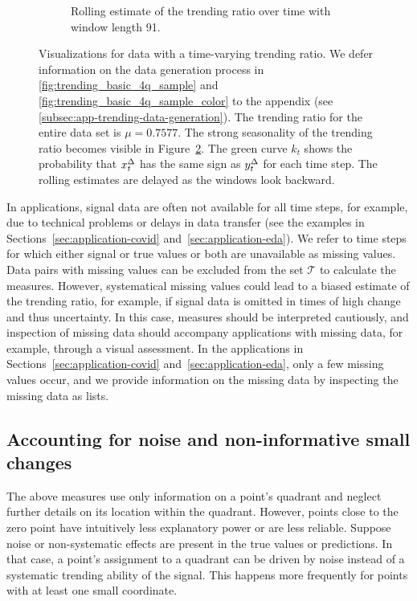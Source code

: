 \begin{figure}
\begin{subfigure}[t]{.48\textwidth}
    \caption{Rolling estimate of the trending ratio over time with window length 91. }\label{fig:trending_ratio_time_series}
    \end{subfigure}%
    \caption{Visualizations for data with a time-varying trending ratio. We defer information on the data generation process in \ref{fig:trending_basic_4q_sample} and \ref{fig:trending_basic_4q_sample_color} to the appendix (see \ref{subsec:app-trending-data-generation}). The trending ratio for the entire data set is $\mu = 0.7577$. The strong seasonality of the trending ratio becomes visible in Figure~\ref{fig:trending_ratio_time_series}. The green curve $k_t$ shows the probability that $x^{\Delta}_{t}$ has the same sign as $y^{\Delta}_{t}$ for each time step. The rolling estimates are delayed as the windows look backward.}
\end{figure} 

In applications, signal data are often not available for all time steps, for example, due to technical problems or delays in data transfer (see the examples in Sections~\ref{sec:application-covid} and~\ref{sec:application-eda}).
We refer to time steps for which either signal or true values or both are unavailable as missing values.
Data pairs with missing values can be excluded from the set $\mathcal{T}$ to calculate the measures. 
However, systematical missing values could lead to a biased estimate of the trending ratio, for example, if signal data is omitted in times of high change and thus uncertainty.
In this case, measures should be interpreted cautiously, and
inspection of missing data should accompany applications with missing data, for example, through a visual assessment.
In the applications in Sections~\ref{sec:application-covid} and~\ref{sec:application-eda}, only a few missing values occur, and we provide information on the missing data by inspecting the missing data as lists.

\subsection{Accounting for noise and non-informative small changes}\label{subsec:trending-noise}

The above measures use only information on a point's quadrant and neglect further details on its location within the quadrant.
However, points close to the zero point have intuitively less explanatory power or are less reliable.
Suppose noise or non-systematic effects are present in the true values or predictions. In that case, a point's assignment to a quadrant can be driven by noise instead of a systematic trending ability of the signal.
This happens more frequently for points with at least one small coordinate.

